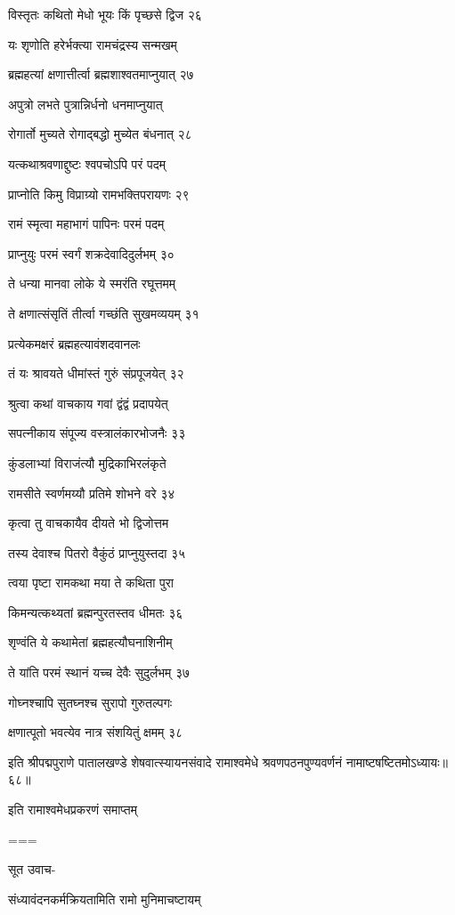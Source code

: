 विस्तृतः कथितो मेधो भूयः किं पृच्छसे द्विज २६

यः शृणोति हरेर्भक्त्या रामचंद्रस्य सन्मखम्

ब्रह्महत्यां क्षणात्तीर्त्वा ब्रह्मशाश्वतमाप्नुयात् २७

अपुत्रो लभते पुत्रान्निर्धनो धनमाप्नुयात्

रोगार्तो मुच्यते रोगाद्बद्धो मुच्येत बंधनात् २८

यत्कथाश्रवणाद्दुष्टः श्वपचोऽपि परं पदम्

प्राप्नोति किमु विप्राग्र्यो रामभक्तिपरायणः २९

रामं स्मृत्वा महाभागं पापिनः परमं पदम्

प्राप्नुयुः परमं स्वर्गं शक्रदेवादिदुर्लभम् ३०

ते धन्या मानवा लोके ये स्मरंति रघूत्तमम्

ते क्षणात्संसृतिं तीर्त्वा गच्छंति सुखमव्ययम् ३१

प्रत्येकमक्षरं ब्रह्महत्यावंशदवानलः

तं यः श्रावयते धीमांस्तं गुरुं संप्रपूजयेत् ३२

श्रुत्वा कथां वाचकाय गवां द्वंद्वं प्रदापयेत्

सपत्नीकाय संपूज्य वस्त्रालंकारभोजनैः ३३

कुंडलाभ्यां विराजंत्यौ मुद्रिकाभिरलंकृते

रामसीते स्वर्णमय्यौ प्रतिमे शोभने वरे ३४

कृत्वा तु वाचकायैव दीयते भो द्विजोत्तम

तस्य देवाश्च पितरो वैकुंठं प्राप्नुयुस्तदा ३५

त्वया पृष्टा रामकथा मया ते कथिता पुरा

किमन्यत्कथ्यतां ब्रह्मन्पुरतस्तव धीमतः ३६

शृण्वंति ये कथामेतां ब्रह्महत्यौघनाशिनीम्

ते यांति परमं स्थानं यच्च देवैः सुदुर्लभम् ३७

गोघ्नश्चापि सुतघ्नश्च सुरापो गुरुतल्पगः

क्षणात्पूतो भवत्येव नात्र संशयितुं क्षमम् ३८

इति श्रीपद्मपुराणे पातालखण्डे शेषवात्स्यायनसंवादे रामाश्वमेधे श्रवणपठनपुण्यवर्णनं नामाष्टषष्टितमोऽध्यायः॥६८॥

इति रामाश्वमेधप्रकरणं समाप्तम्


===





सूत उवाच-

संध्यावंदनकर्मक्रियतामिति रामो मुनिमाचष्टायम्

